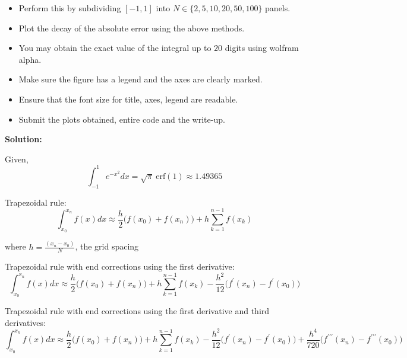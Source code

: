 \documentclass[a4paper,11pt]{report}
\begin{document}
\begin{enumerate}
    \begin{itemize}
    \item Perform this by subdividing $[-1, 1]$ into $N \in \{2, 5, 10, 20, 50,
    100\}$ panels.
    \item Plot the decay of the absolute error using the above methods.
    \item You may obtain the exact value of the integral up to $20$ digits 
    using wolfram alpha.
    \item Make sure the figure has a legend and the axes are clearly marked.
    \item Ensure that the font size for title, axes, legend are readable.
    \item Submit the plots obtained, entire code and the write-up.
    \end{itemize}

    \textbf{Solution:}
        
    Given,
    \begin{equation*}
    \int_{-1}^{1} e^{-x^{2}} dx = \sqrt{\pi}\ \text{erf}(1) \approx 1.49365 
    \end{equation*}

    Trapezoidal rule:
    \begin{equation*}
    \int_{x_{0}}^{x_{n}} f(x) dx \approx \frac{h}{2} \Big(f(x_{0}) + 
    f(x_{n}) \Big) + h \sum_{k=1}^{n-1} f(x_{k})
    \end{equation*}

    where $h = \displaystyle \frac{(x_{n} - x_{0})}{N}$, the grid spacing

    Trapezoidal rule with end corrections using the first derivative:
    \begin{equation*}
    \int_{x_{0}}^{x_{n}} f(x) dx \approx \frac{h}{2} \Big(f(x_{0}) + 
    f(x_{n}) \Big) + h \sum_{k=1}^{n-1} f(x_{k}) - \frac{h^{2}}{12} 
    \Big(f^{\prime}(x_{n}) - f^{\prime}(x_{0}) \Big)
    \end{equation*}

    Trapezoidal rule with end corrections using the first derivative and 
    third derivatives:
    \begin{equation*}
    \int_{x_{0}}^{x_{n}} f(x) dx \approx \frac{h}{2} \Big(f(x_{0}) + 
    f(x_{n}) \Big) + h \sum_{k=1}^{n-1} f(x_{k}) - \frac{h^{2}}{12} 
    \Big(f^{\prime}(x_{n}) - f^{\prime}(x_{0}) \Big) + \frac{h^{4}}{720} 
    \Big(f^{\prime\prime\prime}(x_{n}) - f^{\prime\prime\prime}(x_{0}) \Big)
    \end{equation*}


\end{enumerate}
\end{document}
